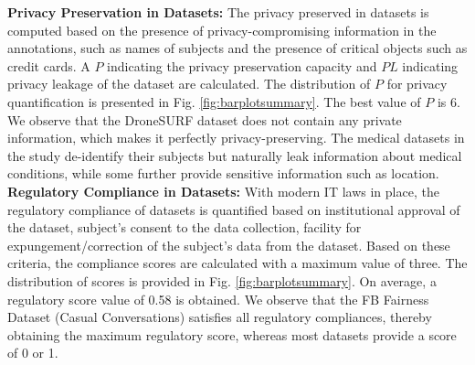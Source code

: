 \documentclass[journal]{IEEEtran}
\begin{document}
\noindent \textbf{Privacy Preservation in Datasets:} The privacy preserved in datasets is computed based on the presence of privacy-compromising information in the annotations, such as names of subjects and the presence of critical objects such as credit cards. A $P$ indicating the privacy preservation capacity and $PL$ indicating privacy leakage of the dataset are calculated. The distribution of $P$ for privacy quantification is presented in Fig. \ref{fig:barplotsummary}. The best value of $P$ is 6. We observe that the DroneSURF dataset does not contain any private information, which makes it perfectly privacy-preserving. The medical datasets in the study de-identify their subjects but naturally leak information about medical conditions, while some further provide sensitive information such as location.
\\


\noindent \textbf{Regulatory Compliance in Datasets: } With modern IT laws in place, the regulatory compliance of datasets is quantified based on institutional approval of the dataset, subject's consent to the data collection, facility for expungement/correction of the subject's data from the dataset. Based on these criteria, the compliance scores are calculated with a maximum value of three. The distribution of scores is provided in Fig. \ref{fig:barplotsummary}. On average, a regulatory score value of 0.58 is obtained. We observe that the FB Fairness Dataset (Casual Conversations) satisfies all regulatory compliances, thereby obtaining the maximum regulatory score, whereas most datasets provide a score of 0 or 1. \\
\end{document}

